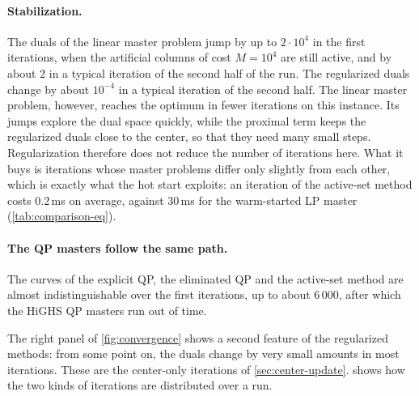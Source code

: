 \paragraph{Stabilization.} The duals of the linear master problem jump by up to $2\cdot10^4$
in the first iterations, when the artificial columns of cost $M = 10^4$ are still active, and
by about
$2$ in a typical iteration of the second half of the run. The regularized duals change by
about $10^{-4}$ in a typical iteration of the second half. The linear master problem, however,
reaches the optimum in fewer iterations on this instance. Its jumps explore the dual space
quickly, while the proximal term keeps the regularized duals close to the center, so that
they need many small steps. Regularization therefore does not reduce the number of
iterations here. What it buys is iterations whose master problems differ only slightly from
each other, which is exactly what the hot start exploits: an iteration of the active-set
method costs $0.2$\,ms on average, against $30$\,ms for the warm-started LP master
(\cref{tab:comparison-eq}).

\paragraph{The QP masters follow the same path.} The curves of the explicit QP, the
eliminated QP and the active-set method are almost indistinguishable over the first
iterations, up to about 6\,000, after which the HiGHS QP masters run out of time.

\medskip

The right panel of \cref{fig:convergence} shows a second feature of the regularized methods:
from some point on, the duals change by very small amounts in most iterations. These are the
center-only iterations of \cref{sec:center-update}.  shows how the two kinds
of iterations are distributed over a run.


